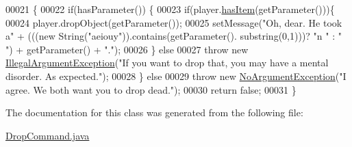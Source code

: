 \begin{DoxyCode}
00021                                                                                               \{
00022         \textcolor{keywordflow}{if}(hasParameter()) \{
00023             \textcolor{keywordflow}{if}(player.\hyperlink{classPlayer_a90cb3f05b491eaed668fe54b9258b755}{hasItem}(getParameter()))\{
00024                 player.dropObject(getParameter());
00025                 setMessage(\textcolor{stringliteral}{"Oh, dear. He took a"} + (((\textcolor{keyword}{new} String(\textcolor{stringliteral}{"aeiouy"})).contains(getParameter().
      substring(0,1)))? \textcolor{stringliteral}{"n "} : \textcolor{stringliteral}{" "}) + getParameter() + \textcolor{stringliteral}{"."});
00026             \} \textcolor{keywordflow}{else}
00027                 \textcolor{keywordflow}{throw} \textcolor{keyword}{new} \hyperlink{classIllegalArgumentException}{IllegalArgumentException}(\textcolor{stringliteral}{"If you want to drop that, you
       may have a mental disorder. As expected."});
00028         \} \textcolor{keywordflow}{else}
00029             \textcolor{keywordflow}{throw} \textcolor{keyword}{new} \hyperlink{classNoArgumentException}{NoArgumentException}(\textcolor{stringliteral}{"I agree. We both want you to drop dead."});
00030         \textcolor{keywordflow}{return} \textcolor{keyword}{false};
00031     \}
\end{DoxyCode}


The documentation for this class was generated from the following file\-:\begin{DoxyCompactItemize}
\item 
\hyperlink{DropCommand_8java}{Drop\-Command.\-java}\end{DoxyCompactItemize}
